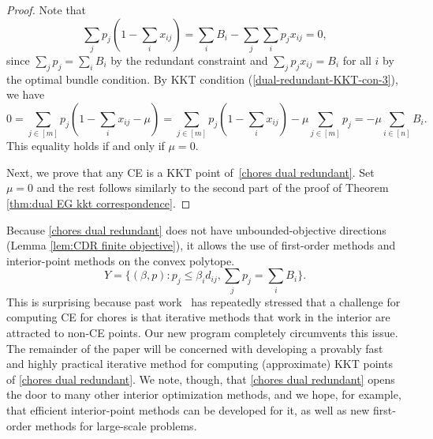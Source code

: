 \documentclass[format=acmsmall,authorversion]{acmart}
\newcommand{\ck}[1]{{\textcolor{red}{CK: #1}}}
\newcommand{\infd}{unbounded-objective direction}
\begin{document}
\begin{proof}
    Note that  
    \begin{equation}
        \sum_j p_j (1 - \sum_i x_{ij}) = \sum_i B_i - \sum_j \sum_i p_j x_{ij} = 0, 
    \end{equation} 
    since $\sum_j p_j = \sum_i B_i$ by the redundant constraint and $\sum_j p_j x_{ij} = B_i$ for all $i$ by the optimal bundle condition. By KKT condition (\cref{dual-redundant-KKT-con-3}), we have
    \begin{equation}
        0 = \sum_{j \in [m]} p_j (1 - \sum_i x_{ij} - \mu) = \sum_{j \in [m]} p_j (1 - \sum_i x_{ij}) - \mu \sum_{j \in [m]} p_j = - \mu \sum_{i \in [n]} B_i. 
    \end{equation}
    This equality holds if and only if $\mu=0$. 

    Next, we prove that any CE is a KKT point of~\ref{chores dual redundant}. Set $\mu=0$ and the rest follows similarly to the second part of the proof of Theorem \ref{thm:dual EG kkt correspondence}. 
\end{proof} 




Because \ref{chores dual redundant} does not have \infd s (Lemma \ref{lem:CDR finite objective}), it allows the use of first-order methods and interior-point methods on the convex polytope. 
\[
    Y = \big\{ (\beta,p) : p_j \leq \beta_i d_{ij}, \sum_j p_j = \sum_i B_i \big\}.
\]
This is surprising because past work~\citep{BogomolnaiaMSY17,boodaghians2022polynomial} has repeatedly stressed that a challenge for computing CE for chores is that iterative methods that work in the interior are attracted to non-CE points. Our new program completely circumvents this issue. The remainder of the paper will be concerned with developing a provably fast and highly practical iterative method for computing (approximate) KKT points of \ref{chores dual redundant}.
We note, though, that \ref{chores dual redundant} opens the door to many other interior optimization methods, and we hope, for example, that efficient interior-point methods can be developed for it, as well as new first-order methods for large-scale problems.
\end{document}
